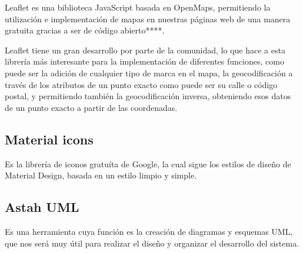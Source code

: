 Leaflet es una biblioteca JavaScript basada en OpenMaps, permitiendo la utilización e implementación de mapas en nuestras páginas web de una manera gratuita gracias a ser de código abierto****.

Leaflet tiene un gran desarrollo por parte de la comunidad, lo que hace a esta librería más interesante para la implementación de diferentes funciones, como puede ser la adición de cualquier tipo de marca en el mapa, la geocodificación a través de los atributos de un punto exacto como puede ser su calle o código postal, y permitiendo también la geocodificación inversa, obteniendo esos datos de un punto exacto a partir de las coordenadas.

    \subsection{Material icons}

Es la librería de iconos gratuíta de Google, la cual sigue los estilos de diseño de Material Design, basada en un estilo limpio y simple.

    \subsection{Astah UML}
Es una herramienta cuya función es la creación de diagramas y esquemas UML, que nos será muy útil para realizar el diseño y organizar el desarrollo del sistema.
